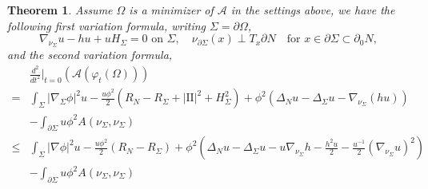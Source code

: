 \documentclass[12pt]{amsart}
\newcommand{\sff}{\mathrm{I\!I}}
\newcommand{\p}{\partial}
\newtheorem{theorem}{Theorem}[section]
\numberwithin{equation}{section}
\begin{document}
	\begin{theorem} \label{VarForm}
		Assume $\Omega$ is a minimizer of $\mathcal{A}$ in the settings above, we have the following first  variation formula, writing $\Sigma =\p \Omega$,
		\begin{equation*}
			\nabla_{\nu_{\Sigma}} u-hu+uH_{\Sigma} =0 \text{ on } \Sigma, \quad \nu_{\partial \Sigma} (x) \perp T_x\partial N \quad \text{for }x \in \partial \Sigma \subset \partial_0 N ,
		\end{equation*}
		and the second variation formula,
		\begin{align*}
			&\frac{d^2}{dt^2}\Big\vert_{t=0}(\mathcal{A}(\varphi_t(\Omega)))\\
			=&\int_{\Sigma} |\nabla_{\Sigma} \phi|^2u  -\frac{u\phi^2}{2}(R_{N}-R_{\Sigma}+|\sff|^2+H^2_{\Sigma})+ \phi^2 (\Delta_N u-\Delta_{\Sigma}u-\nabla_{\nu_{\Sigma}} (hu))\\
			& -\int_{\partial \Sigma} u  \phi^2 A(\nu_{\Sigma},\nu_{\Sigma})\\
			\leq & \int_{\Sigma} |\nabla \phi|^2u  -\frac{u\phi^2}{2}(R_{N}-R_{\Sigma})+\phi^2(\Delta_N u-\Delta_{\Sigma}u-u\nabla_{\nu_{\Sigma}} h-\frac{h^2u}{2}-\frac{u^{-1}}{2}(\nabla_{\nu_{\Sigma}}u)^2)\\
			& -\int_{\partial \Sigma} u  \phi^2 A(\nu_{\Sigma},\nu_{\Sigma})
		\end{align*}
	\end{theorem}
\end{document}
